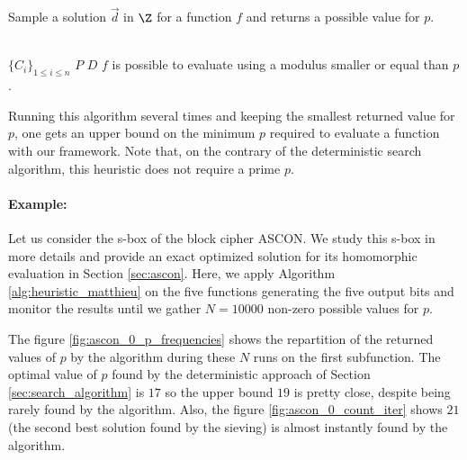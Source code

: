 \begin{algorithm}
    \caption{Sample a solution $\vec d$ in $\Z$ for a function $f$ and returns a possible value for $p$.}
    \label{alg:heuristic_matthieu}
    \begin{algorithmic}
    \Require \\
    $\{C_i\}_{1 \le i \le n}$  \newline
    $P$  \newline
    $D$ 
    \Ensure $f$ is possible to evaluate using a modulus smaller or equal than $p$.
     
      
                  
             
        \EndIf
    \EndFor
         
    \EndIf   
    \end{algorithmic}
\end{algorithm}


Running this algorithm several times and keeping the smallest returned value for $p$, one gets an upper bound on the minimum $p$ required to evaluate a function with our framework. Note that, on the contrary of the deterministic search algorithm, this heuristic does not require a prime $p$.


\paragraph{Example:} Let us consider the s-box of the block cipher ASCON. We study this s-box in more details and provide an exact optimized solution for its homomorphic evaluation in Section \ref{sec:ascon}. Here, we apply Algorithm \ref{alg:heuristic_matthieu} on the five functions generating the five output bits and monitor the results until we gather $N=10000$ non-zero possible values for $p$.


The figure \ref{fig:ascon_0_p_frequencies} shows the repartition of the returned values of $p$ by the algorithm during these $N$ runs on the first subfunction. The optimal value of $p$ found by the deterministic approach of Section \ref{sec:search_algorithm} is $17$ so the upper bound $19$ is pretty close, despite being rarely found by the algorithm. Also, the figure \ref{fig:ascon_0_count_iter} shows $21$ (the second best solution found by the sieving) is almost instantly found by the algorithm.


